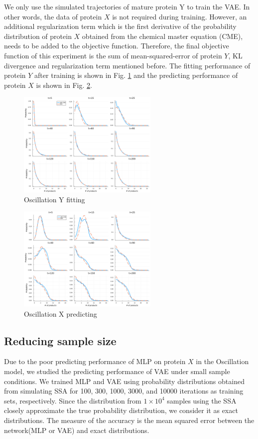 \documentclass[a4paper,10pt]{article}
\begin{document}
We only use the simulated trajectories of mature protein Y to train the VAE. In other words, the data of protein $X$ is not required during training. However, an additional regularization term which is the first derivative of the probability distribution of protein $X$ obtained from the chemical master equation (CME), needs to be added to the objective function. Therefore, the final objective function of this experiment is the sum of mean-squared-error of protein $Y$, KL divergence and regularization term mentioned before. The fitting performance of protein $Y$ after training is shown in Fig. \ref{Oscillation_Y_fitting} and the predicting performance of protein $X$ is shown in Fig. \ref{Oscillation_X_predicting}.
\begin{figure}[h]
	\centering
	\includegraphics[width=0.6\textwidth]{Figs/Oscillation_Y_fitting.pdf}
	\caption{Oscillation Y fitting}\label{Oscillation_Y_fitting}  
\end{figure}
\begin{figure}[h]
	\centering
	\includegraphics[width=0.6\textwidth]{Figs/Oscillation_X_predicting.pdf}
	\caption{Oscillation X predicting}\label{Oscillation_X_predicting}  
\end{figure}
\subsection{Reducing sample size}
Due to the poor predicting performance of MLP\cite{jiang2021neural} on protein $X$ in the Oscillation model, we studied the predicting performance of VAE under small sample conditions. We trained MLP and VAE using probability distributions obtained from simulating SSA for 100, 300, 1000, 3000, and 10000 iterations as training sets, respectively. Since the distribution from  $1 \times 10^4$ samples using the SSA closely approximate the true probability distribution, we consider it as exact distributions. The measure of the accuracy is the mean squared error between the network(MLP or VAE) and exact distributions.
\end{document}
